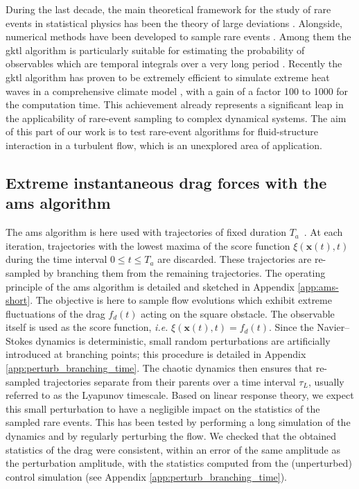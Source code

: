 During the last decade, the main theoretical framework for the study of rare events in statistical physics has been the theory of large deviations \citep{touchette_large_2009}.
Alongside, numerical methods have been developed to sample rare events \citep{DelMoralBook}. 
Among them the \ac{gktl} algorithm \citep{giardina_direct_2006} is particularly suitable for estimating the probability of observables which are temporal integrals over a very long period \citep{giardina_simulating_2011,Laffargue_2013}.
%
Recently the \ac{gktl} algorithm has proven to be extremely efficient to simulate extreme heat waves in a comprehensive climate model \citep{ragone_computation_2018}, with a gain of a factor 100 to 1000 for the computation time.
This achievement already represents a significant leap in the applicability of rare-event sampling to complex dynamical systems. 
The aim of this part of our work is to test rare-event algorithms for fluid-structure interaction in a turbulent flow, which is an unexplored area of application. 

\subsection{Extreme instantaneous drag forces with the \acl{ams} algorithm}
\label{sec:ams}

The \ac{ams} algorithm is here used with trajectories of fixed duration $T_a$~\citep{lestang_computing_2018}.
%
%
At each iteration, trajectories with the lowest maxima of the score function $\xi (\mathbf{x}(t),t)$ during the time interval $0\leq t \leq T_a$ are discarded. 
These trajectories are re-sampled by branching them from the remaining trajectories.
The operating principle of the \ac{ams} algorithm is detailed and sketched in Appendix \ref{app:ams-short}.
The objective is here to sample flow evolutions which exhibit extreme fluctuations of the drag $f_d(t)$ acting on the square obstacle.
The observable itself is used as the score function, \emph{i.e.} $\xi (\mathbf{x}(t),t) = f_d(t)$.  
%
Since the Navier--Stokes dynamics is deterministic, small random perturbations are artificially introduced at branching points; this procedure is detailed in Appendix \ref{app:perturb_branching_time}.
The chaotic dynamics then ensures that re-sampled trajectories separate from their parents over a time interval $\tau_L$, usually referred to as the Lyapunov timescale.
Based on linear response theory, we expect this small perturbation to have a negligible impact on the statistics of the sampled rare events. This has been tested by performing a long simulation of the dynamics and by regularly perturbing the flow. We checked that the obtained statistics of the drag were consistent, within an error of the same amplitude as the perturbation amplitude, with the statistics computed from the (unperturbed) control simulation (see Appendix \ref{app:perturb_branching_time}).

